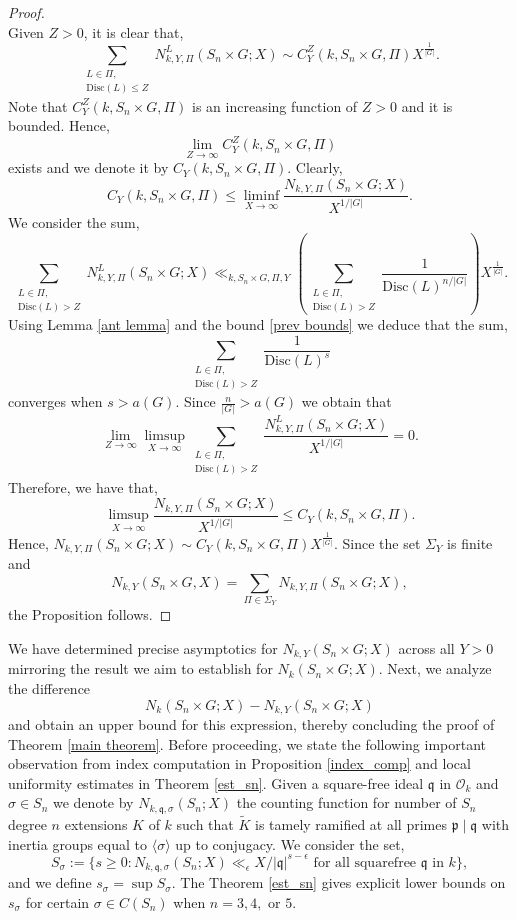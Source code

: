 \documentclass[11pt]{amsart}
\newcommand{\fq}{\mathfrak{q}}
\newcommand{\cO}{\mathcal{O}}
\newcommand{\fp}{\mathfrak{p}}
\newcommand{\disc}{\mathrm{Disc}}
\numberwithin{equation}{section}
\begin{document}
\begin{proof}
\[    \]
    Given $Z > 0$, it is clear that,
    \[
    \sum_{\substack{L \in \Pi,\\\disc(L) \leq Z}} N_{k,Y,\Pi}^L(S_n\times G; X) \sim C_Y^Z(k,S_n\times G, \Pi)X^{\frac{1}{|G|}}.
    \]
    Note that $C_Y^Z(k, S_n\times G, \Pi)$ is an increasing function of $Z > 0$ and it is bounded. Hence,
    \[
    \lim_{Z \to \infty}C_Y^Z(k, S_n\times G, \Pi)
    \]
    exists and we denote it by $C_Y(k, S_n\times G, \Pi)$. Clearly, $$C_Y(k, S_n\times G, \Pi) \leq \liminf_{X \to \infty}\frac{N_{k,Y,\Pi}(S_n\times G; X)}{X^{1/|G|}}.$$
    We consider the sum,
    \[
    \sum_{\substack{L \in \Pi,\\\disc(L) > Z}} N_{k,Y,\Pi}^L(S_n\times G; X) \ll_{k,S_n\times G,\Pi, Y} \left(\sum_{\substack{L \in \Pi,\\\disc(L) > Z}} \frac{1}{\disc(L)^{n/|G|}}\right)X^{\frac{1}{|G|}}.
    \]
    Using Lemma \ref{ant lemma} and the bound \ref{prev bounds} we deduce that the sum,
    \[
    \sum_{\substack{L \in \Pi,\\\disc(L) > Z}} \frac{1}{\disc(L)^{s}}
    \]
    converges when $s > a(G)$. Since $\frac{n}{|G|} > a(G)$ we obtain that
    \[
    \lim_{Z \to \infty}\limsup_{X\to \infty} \sum_{\substack{L \in \Pi,\\\disc(L) > Z}} \frac{N_{k,Y,\Pi}^L(S_n\times G; X)}{X^{1/|G|}} = 0.
    \]
    Therefore, we have that,
    \[
    \limsup_{X \to \infty}\frac{N_{k,Y,\Pi}(S_n\times G; X)}{X^{1/|G|}} \leq C_Y(k, S_n\times G, \Pi).
    \]
    Hence, $N_{k,Y,\Pi}(S_n\times G; X)\sim C_Y(k, S_n\times G, \Pi)X^{\frac{1}{|G|}}$. Since the set $\Sigma_Y$ is finite and
    \[
    N_{k,Y}(S_n\times G, X)= \sum_{\Pi \in \Sigma_Y} N_{k,Y,\Pi}(S_n\times G; X),
    \]
    the Proposition follows.
\end{proof}
We have determined precise asymptotics for $N_{k, Y}(S_n\times G; X)$ across all $Y > 0$ mirroring the result we aim to establish for $N_{k}(S_n\times G; X)$. Next, we analyze the difference
\[N_k(S_n\times G; X) - N_{k, Y}(S_n\times G; X)\]
and obtain an upper bound for this expression, thereby concluding the proof of Theorem \ref{main theorem}. Before proceeding, we state the following important observation from index computation in Proposition \ref{index_comp} and local uniformity estimates in Theorem \ref{est_sn}.
Given a square-free ideal $\fq$ in $\cO_k$ and $\sigma \in S_n$ we denote by $N_{k,\fq,\sigma}(S_n; X)$ the counting function for number of $S_n$ degree $n$ extensions $K$ of $k$ such that $\widetilde{K}$ is tamely ramified at all primes $\fp \mid \fq$ with inertia groups equal to $\langle\sigma \rangle$ up to conjugacy. We consider the set,
\[
S_{\sigma}:=\{s \geq 0 : N_{k,\fq,\sigma}(S_n; X) \ll_{\epsilon} X/|\fq|^{s-\epsilon}\text{ for all squarefree }\fq\text{ in }k\},
\]
and we define $s_{\sigma} = \sup S_{\sigma}$. The Theorem \ref{est_sn} gives explicit lower bounds on $s_\sigma$ for certain $\sigma \in C(S_n)$ when $n =3,4,$ or $5$.
\end{document}
